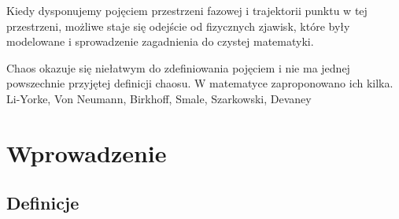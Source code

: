 \documentclass[licencjacka]{pwr_wmat_praca_dyplomowa}
\theoremstyle{plain}
\numberwithin{theorem}{chapter}
\theoremstyle{definition}
\numberwithin{theorem}{chapter}
\begin{document}
Kiedy dysponujemy pojęciem przestrzeni fazowej i trajektorii punktu w tej przestrzeni, możliwe staje się odejście od fizycznych zjawisk, które były modelowane i sprowadzenie zagadnienia do czystej matematyki. 

Chaos okazuje się niełatwym do zdefiniowania pojęciem i nie ma jednej powszechnie przyjętej definicji chaosu. W matematyce zaproponowano ich kilka. 
Li-Yorke, Von Neumann, Birkhoff, Smale, Szarkowski, Devaney






\chapter{Wprowadzenie}

\section{Definicje}
\end{document}

